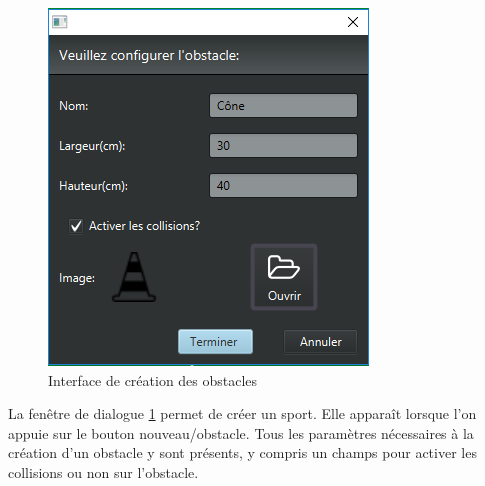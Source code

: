 \begin{figure}[htpb]
    \centering
    \includegraphics[scale=0.6]{fig/gui/newObstacle.png}
    \caption{Interface de création des obstacles}
    \label{fig:gui:newObstacle}
\end{figure}

La fenêtre de dialogue \ref{fig:gui:newObstacle} permet de créer un sport.
Elle apparaît lorsque l'on appuie sur le bouton nouveau/obstacle.
Tous les paramètres nécessaires à la création d'un obstacle y sont présents, y compris un champs pour activer les collisions ou non sur l'obstacle.

\newpage
